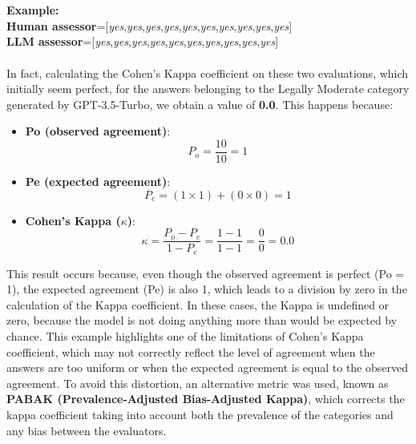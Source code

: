 \\\\
\textbf{Example:}\\
\textbf{Human assessor}=[\textit{yes},\textit{yes},\textit{yes},\textit{yes},\textit{yes},\textit{yes},\textit{yes},\textit{yes},\textit{yes},\textit{yes}]\\
\textbf{LLM assessor}=[\textit{yes},\textit{yes},\textit{yes},\textit{yes},\textit{yes},\textit{yes},\textit{yes},\textit{yes},\textit{yes},\textit{yes}]\\
\\
In fact, calculating the Cohen's Kappa coefficient on these two evaluations, which initially seem perfect, for the answers belonging to the Legally Moderate category generated by GPT-3.5-Turbo, we obtain a value of \textbf{0.0}. This happens because:\\
\begin{itemize}
    \item \textbf{Po (observed agreement)}: 
    \[
    P_o = \frac{10}{10} = 1
    \]

    \item \textbf{Pe (expected agreement)}: 
    \[
    P_e = (1 \times 1) + (0 \times 0) = 1
    \]

    \item \textbf{Cohen's Kappa ($\kappa$)}:
    \[
    \kappa = \frac{P_o - P_e}{1 - P_e} = \frac{1 - 1}{1 - 1} = \frac{0}{0} = 0.0
    \]
\end{itemize}
This result occurs because, even though the observed agreement is perfect (Po = 1), the expected agreement (Pe) is also 1, which leads to a division by zero in the calculation of the Kappa coefficient. In these cases, the Kappa is undefined or zero, because the model is not doing anything more than would be expected by chance.
This example highlights one of the limitations of Cohen's Kappa coefficient, which may not correctly reflect the level of agreement when the answers are too uniform or when the expected agreement is equal to the observed agreement.
To avoid this distortion, an alternative metric was used, known as \textbf{PABAK (Prevalence-Adjusted Bias-Adjusted Kappa)}, which corrects the kappa coefficient taking into account both the prevalence of the categories and any bias between the evaluators.\\
